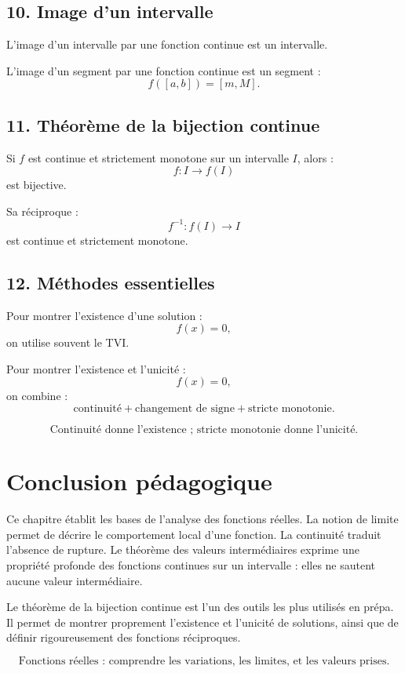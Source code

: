 \documentclass[11pt,a4paper]{article}
\begin{document}
\subsection*{10. Image d'un intervalle}

L'image d'un intervalle par une fonction continue est un intervalle.

L'image d'un segment par une fonction continue est un segment :
\[
f([a,b])=[m,M].
\]

\subsection*{11. Théorème de la bijection continue}

Si \(f\) est continue et strictement monotone sur un intervalle \(I\), alors :
\[
f:I\to f(I)
\]
est bijective.

Sa réciproque :
\[
f^{-1}:f(I)\to I
\]
est continue et strictement monotone.

\subsection*{12. Méthodes essentielles}

Pour montrer l'existence d'une solution :
\[
f(x)=0,
\]
on utilise souvent le TVI.

Pour montrer l'existence et l'unicité :
\[
f(x)=0,
\]
on combine :
\[
\text{continuité}
+
\text{changement de signe}
+
\text{stricte monotonie}.
\]

\begin{center}
\[
\boxed{
\text{Continuité donne l'existence ; stricte monotonie donne l'unicité.}
}
\]
\end{center}

\section*{Conclusion pédagogique}

Ce chapitre établit les bases de l'analyse des fonctions réelles.  
La notion de limite permet de décrire le comportement local d'une fonction.  
La continuité traduit l'absence de rupture.  
Le théorème des valeurs intermédiaires exprime une propriété profonde des fonctions continues sur un intervalle : elles ne sautent aucune valeur intermédiaire.

Le théorème de la bijection continue est l'un des outils les plus utilisés en prépa.  
Il permet de montrer proprement l'existence et l'unicité de solutions, ainsi que de définir rigoureusement des fonctions réciproques.

\begin{center}
\[
\boxed{
\text{Fonctions réelles : comprendre les variations, les limites, et les valeurs prises.}
}
\]
\end{center}
\end{document}
